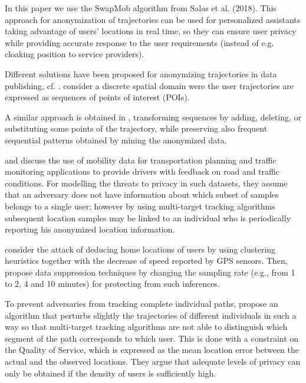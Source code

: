 \documentclass[times,twocolumn,final,authoryear]{elsarticle}
\begin{document}
In this paper we use the SwapMob algorithm from Salas et al. (2018). This approach for anonymization of trajectories can be used for personalized assistants taking advantage of users' locations in real time, so they can ensure user privacy while providing accurate response to the user requirements (instead of e.g. cloaking position to service providers).


Different solutions have been proposed for anonymizing trajectories in data publishing, cf. \cite{Fiore:2019}. 
\cite{Terrovitis:2008} consider a discrete spatial domain were the user trajectories are expressed as sequences of points of interest (POIs).


A similar approach is obtained in \cite{Pensa2008}, transforming sequences by adding, deleting, or substituting some points of the trajectory, while preserving also frequent sequential patterns \citep{Agrawal:1995} obtained by mining the anonymized data.


\cite{Hoh2005} and \cite{Hoh06} discuss the use of mobility data for transportation planning and traffic monitoring applications to provide drivers with feedback on road and traffic conditions.
For modelling the threats to privacy in such datasets, they assume that an adversary does not have information about which subset of samples belongs to a single user; 
however by using multi-target tracking algorithms \citep{Reid79analgorithm} subsequent location samples may be linked to an individual who is periodically reporting his anonymized location information.

\cite{Hoh06} consider the attack of deducing home locations of users by using clustering heuristics together with the decrease of speed reported by GPS sensors. Then, propose data suppression techniques by changing the sampling rate (e.g., from 1 to 2, 4 and 10 minutes) for protecting from such inferences.

To prevent adversaries from tracking complete individual paths, \cite{Hoh2005} propose an algorithm that perturbs slightly the trajectories of different individuals in such a way so that multi-target tracking algorithms are not able to distinguish which segment of the path corresponds to which user.
This is done with a constraint on the Quality of Service, which is expressed as the mean location error between the actual and the observed locations. They argue that adequate levels of privacy can only be obtained if the density of users is sufficiently high.
\end{document}
